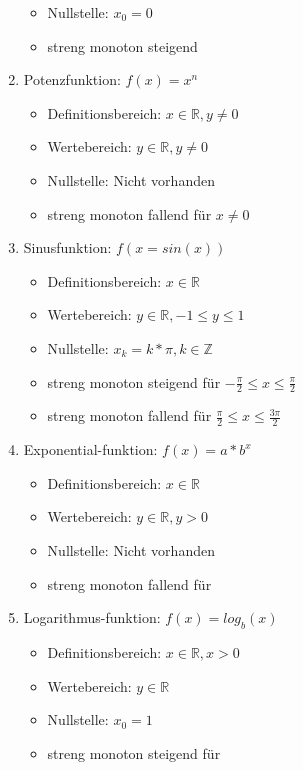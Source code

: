 \begin{enumerate}
\begin{itemize}
              \item Nullstelle: $x_0=0$
              \item streng monoton steigend
          \end{itemize}
    \item Potenzfunktion: $f(x)=x^n$\begin{itemize}
              \item Definitionsbereich: $x\in\mathbb{R},y\neq 0$
              \item Wertebereich: $y\in\mathbb{R},y\neq 0$
              \item Nullstelle: Nicht vorhanden
              \item streng monoton fallend für $x \neq 0$
          \end{itemize}
    \item Sinusfunktion: $f(x=sin(x))$\begin{itemize}
              \item Definitionsbereich: $x\in\mathbb{R}$
              \item Wertebereich: $y\in\mathbb{R},-1 \leq y \leq 1$
              \item Nullstelle: $x_k=k * \pi,k \in \mathbb{Z}$
              \item streng monoton steigend für $-\frac{\pi}{2}\leq x \leq \frac{\pi}{2}$
              \item streng monoton fallend für $\frac{\pi}{2}\leq x \leq \frac{3\pi}{2}$
          \end{itemize}
    \item Exponential-funktion: $f(x)=a*b^x$\begin{itemize}
              \item Definitionsbereich: $x\in\mathbb{R}$
              \item Wertebereich: $y\in\mathbb{R},y > 0$
              \item Nullstelle: Nicht vorhanden
              \item streng monoton fallend für
          \end{itemize}
    \item Logarithmus-funktion: $f(x)=log_b(x)$\begin{itemize}
              \item Definitionsbereich: $x\in\mathbb{R},x > 0$
              \item Wertebereich: $y\in\mathbb{R}$
              \item Nullstelle: $x_0=1$
              \item streng monoton steigend für
          \end{itemize}
\end{enumerate}

